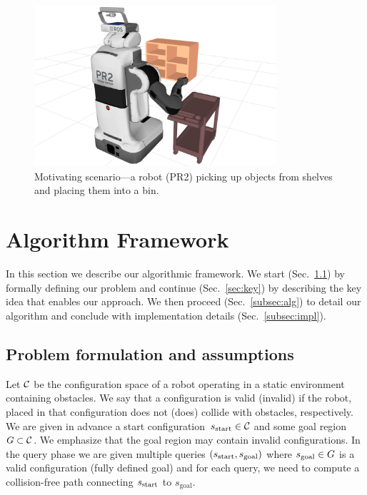 \documentclass[a4paper]{report}
\begin{document}
\begin{figure}[tb]
  \centering
    \includegraphics[width=0.8\textwidth]{pr2.png}
  \caption{
  Motivating scenario---a robot (PR2) picking up objects from shelves and placing them into a bin.
}
    \label{fig:PR2}
\end{figure}

\section{Algorithm Framework}
\label{sec:alg}
In this section we describe our algorithmic framework. We start (Sec.~\ref{sec:pdef}) by formally defining our problem and continue (Sec.~\ref{sec:key}) by describing the key idea that enables our approach.
We then proceed (Sec.~\ref{subsec:alg}) to detail our algorithm and conclude with implementation details (Sec.~\ref{subsec:impl}).

\subsection{Problem formulation and assumptions}
\label{sec:pdef}
Let $\mathcal{C}$ be the configuration space of a robot operating in a static environment containing obstacles.
We say that a configuration is valid (invalid) if the robot, placed in that configuration does not (does) collide with obstacles, respectively.
We are given in advance a start configuration~$s_{\textrm{start}} \in \mathcal{C}$ and some goal region~$G \subset \mathcal{C}$.
We emphasize that the goal region may contain invalid configurations.
In the query phase we are given multiple queries $(s_{\textrm{start}}, s_{\text{goal}})$ where $s_{\rm goal} \in G$ is a valid configuration (fully defined goal) and for each query, we need to compute a collision-free path connecting $s_{\textrm{start}}$ to $s_{\text{goal}}$.
\end{document}
